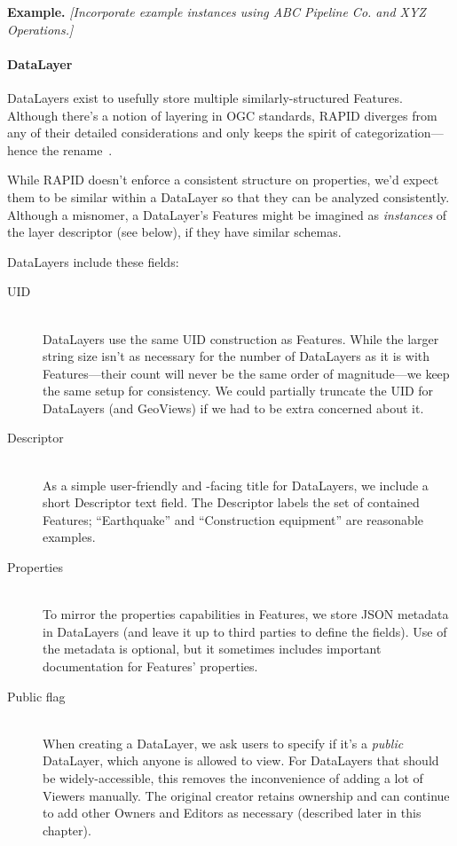 \textbf{Example.} \textit{[Incorporate example instances using ABC Pipeline Co. and XYZ Operations.]}

\paragraph{DataLayer}
DataLayers exist to usefully store multiple similarly-structured Features. Although there's a notion of layering in OGC standards, RAPID diverges from any of their detailed considerations and only keeps the spirit of categorization---hence the rename~\cite{AbstractSpecFaq,SFA,WFS}.

While RAPID doesn't enforce a consistent structure on properties, we'd expect them to be similar within a DataLayer so that they can be analyzed consistently. Although a misnomer, a DataLayer's Features might be imagined as \textit{instances} of the layer descriptor (see below), if they have similar schemas.

DataLayers include these fields:

\begin{description}

\item[UID] \hfill \\
DataLayers use the same UID construction as Features. While the larger string size isn't as necessary for the number of DataLayers as it is with Features---their count will never be the same order of magnitude---we keep the same setup for consistency. We could partially truncate the UID for DataLayers (and GeoViews) if we had to be extra concerned about it.

\item[Descriptor] \hfill \\
As a simple user-friendly and -facing title for DataLayers, we include a short Descriptor text field. The Descriptor labels the set of contained Features; ``Earthquake'' and ``Construction equipment'' are reasonable examples.

\item[Properties] \hfill \\
To mirror the properties capabilities in Features, we store JSON metadata in DataLayers (and leave it up to third parties to define the fields). Use of the metadata is optional, but it sometimes includes important documentation for Features' properties.

\item[Public flag] \hfill \\
When creating a DataLayer, we ask users to specify if it's a \textit{public} DataLayer, which anyone is allowed to view. For DataLayers that should be widely-accessible, this removes the inconvenience of adding a lot of Viewers manually. The original creator retains ownership and can continue to add other Owners and Editors as necessary (described later in this chapter).
  
\end{description}

